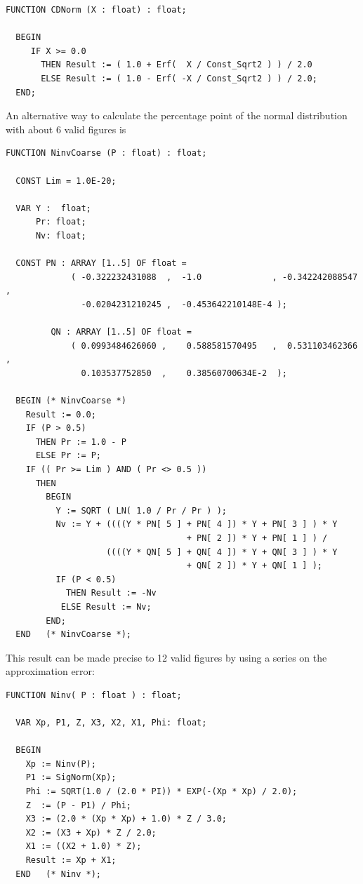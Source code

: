 \begin{refsection}
\begin{lstlisting}[caption=Cumulative normal distribution probability]
  FUNCTION CDNorm (X : float) : float;

  BEGIN
     IF X >= 0.0
       THEN Result := ( 1.0 + Erf(  X / Const_Sqrt2 ) ) / 2.0
       ELSE Result := ( 1.0 - Erf( -X / Const_Sqrt2 ) ) / 2.0;
  END;
\end{lstlisting}

An alternative way to calculate the percentage point of the normal distribution with about \num{6} valid figures is
\begin{lstlisting}[caption=percentage point of normal distribution]
  FUNCTION NinvCoarse (P : float) : float;

  CONST Lim = 1.0E-20;

  VAR Y :  float;
      Pr: float;
      Nv: float;

  CONST PN : ARRAY [1..5] OF float =
             ( -0.322232431088  ,  -1.0              , -0.342242088547  ,
               -0.0204231210245 ,  -0.453642210148E-4 );

         QN : ARRAY [1..5] OF float =
             ( 0.0993484626060 ,    0.588581570495   ,  0.531103462366  ,
               0.103537752850  ,    0.38560700634E-2  );

  BEGIN (* NinvCoarse *)
    Result := 0.0;
    IF (P > 0.5)
      THEN Pr := 1.0 - P
      ELSE Pr := P;
    IF (( Pr >= Lim ) AND ( Pr <> 0.5 ))
      THEN
        BEGIN
          Y := SQRT ( LN( 1.0 / Pr / Pr ) );
          Nv := Y + ((((Y * PN[ 5 ] + PN[ 4 ]) * Y + PN[ 3 ] ) * Y
                                    + PN[ 2 ]) * Y + PN[ 1 ] ) /
                    ((((Y * QN[ 5 ] + QN[ 4 ]) * Y + QN[ 3 ] ) * Y
                                    + QN[ 2 ]) * Y + QN[ 1 ] );
          IF (P < 0.5)
            THEN Result := -Nv
           ELSE Result := Nv;
        END;
  END   (* NinvCoarse *);
\end{lstlisting}
This result can be made precise to \num{12} valid figures by using a  series on the approximation error:
\begin{lstlisting}[caption=percentage point of normal distribution]
  FUNCTION Ninv( P : float ) : float;

  VAR Xp, P1, Z, X3, X2, X1, Phi: float;

  BEGIN
    Xp := Ninv(P);
    P1 := SigNorm(Xp);
    Phi := SQRT(1.0 / (2.0 * PI)) * EXP(-(Xp * Xp) / 2.0);
    Z  := (P - P1) / Phi;
    X3 := (2.0 * (Xp * Xp) + 1.0) * Z / 3.0;
    X2 := (X3 + Xp) * Z / 2.0;
    X1 := ((X2 + 1.0) * Z);
    Result := Xp + X1;
  END   (* Ninv *);
\end{lstlisting}



\end{refsection}
